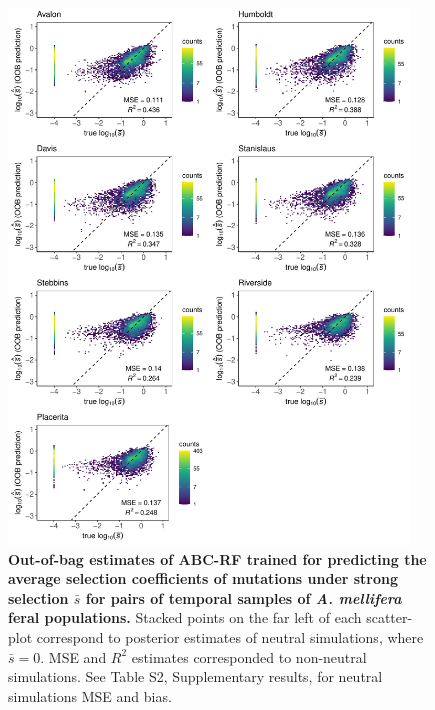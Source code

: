 \documentclass[a4paper, 12pt]{article}
\begin{document}
\begin{figure}[ht]
  \centering
  \includegraphics[width=0.95\textwidth]{Figures/FigureS21_combined_plot_gammasel.pdf}
  \small\caption{\textbf{Out-of-bag estimates of ABC-RF trained for predicting the average selection coefficients of mutations under strong selection $\bar{s}$ for pairs of temporal samples of \textit{A. mellifera} feral populations.} Stacked points on the far left of each scatter-plot correspond to posterior estimates of neutral simulations, where $\bar{s} = 0$. MSE and $R^2$ estimates corresponded to non-neutral simulations. See Table S2, Supplementary results, for neutral simulations MSE and bias.}
  \label{fig:supple_feralbee_gammaselmean}
\end{figure}
\end{document}
